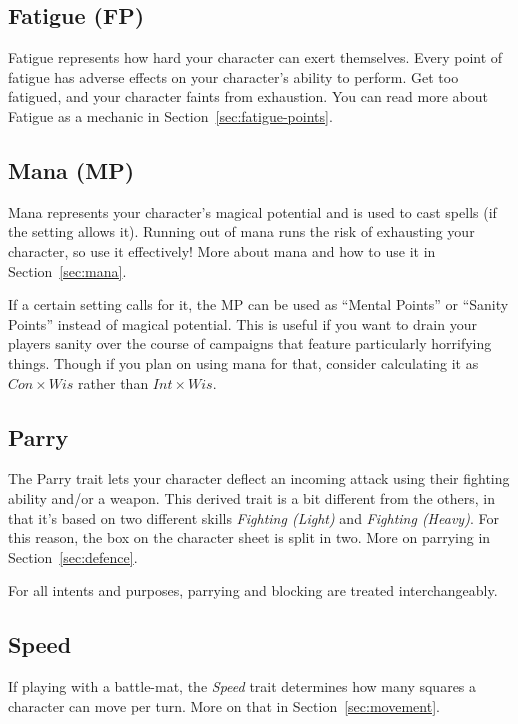 \subsection{Fatigue (FP)}
Fatigue represents how hard your character can exert themselves.
Every point of fatigue has adverse effects on your character's ability to perform.
Get too fatigued, and your character faints from exhaustion.
You can read more about Fatigue as a mechanic in Section~\ref{sec:fatigue-points}.

\subsection{Mana (MP)}\label{sec:traits-mp}
Mana represents your character's magical potential and is used to cast spells (if the setting allows it).
Running out of mana runs the risk of exhausting your character, so use it effectively!
More about mana and how to use it in Section~\ref{sec:mana}.

\begin{note} 
    If a certain setting calls for it, the MP can be used as ``Mental Points'' or ``Sanity Points'' instead of magical potential.
    This is useful if you want to drain your players sanity over the course of campaigns that feature particularly horrifying things.
    Though if you plan on using mana for that, consider calculating it as $Con \times Wis$ rather than $Int \times Wis$.
\end{note}

\subsection{Parry}
The Parry trait lets your character deflect an incoming attack using their fighting ability and/or a weapon.
This derived trait is a bit different from the others, in that it's based on two different skills \textit{Fighting (Light)} and \textit{Fighting (Heavy)}.
For this reason, the box on the character sheet is split in two.
More on parrying in Section~\ref{sec:defence}.

\begin{note} 
    For all intents and purposes, parrying and blocking are treated interchangeably.
\end{note}

\subsection{Speed}
If playing with a battle-mat, the \textit{Speed} trait determines how many squares a character can move per turn.
More on that in Section~\ref{sec:movement}.

